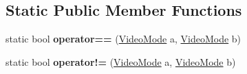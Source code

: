 \subsection*{Static Public Member Functions}
\begin{DoxyCompactItemize}
\item 
\mbox{\label{struct_glfw3_1_1_glfw_1_1_video_mode_aface5c6fc514d20fc0074beb926f2eea}} 
static bool {\bfseries operator==} (\mbox{\hyperlink{struct_glfw3_1_1_glfw_1_1_video_mode}{Video\+Mode}} a, \mbox{\hyperlink{struct_glfw3_1_1_glfw_1_1_video_mode}{Video\+Mode}} b)
\item 
\mbox{\label{struct_glfw3_1_1_glfw_1_1_video_mode_a444befce22fdfc48909c95aeffc58d30}} 
static bool {\bfseries operator!=} (\mbox{\hyperlink{struct_glfw3_1_1_glfw_1_1_video_mode}{Video\+Mode}} a, \mbox{\hyperlink{struct_glfw3_1_1_glfw_1_1_video_mode}{Video\+Mode}} b)
\end{DoxyCompactItemize}
